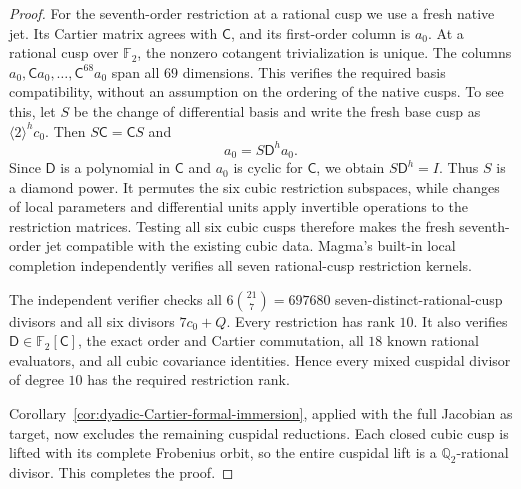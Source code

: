 \begin{proof}
For the seventh-order restriction at a rational cusp we use a
fresh native jet. Its Cartier matrix agrees with $\mathsf C$,
and its first-order column is $a_0$. At a rational cusp over
$\mathbb F_2$, the nonzero cotangent trivialization is unique. The columns
$a_0,\mathsf C a_0,\ldots,\mathsf C^{68}a_0$ span all $69$
dimensions. This verifies the required basis compatibility,
without an assumption on the ordering of the native cusps.
To see this, let $S$ be the change of differential basis and write
the fresh base cusp as $\langle2\rangle^h c_0$. Then
$S\mathsf C=\mathsf C S$ and
\[
 a_0=S\mathsf D^h a_0.
\]
Since $\mathsf D$ is a polynomial in $\mathsf C$ and $a_0$ is
cyclic for $\mathsf C$, we obtain $S\mathsf D^h=I$.
Thus $S$ is a diamond power. It permutes the six cubic restriction
subspaces, while changes of local parameters and differential
units apply invertible operations to the restriction matrices.
Testing all six cubic cusps therefore makes the fresh
seventh-order jet compatible with the existing cubic data.
Magma's built-in local completion independently verifies all seven
rational-cusp restriction kernels.

The independent verifier checks all
$6\binom{21}{7}=697680$ seven-distinct-rational-cusp divisors and
all six divisors $7c_0+Q$. Every restriction has rank $10$.
It also verifies $\mathsf D\in\mathbb F_2[\mathsf C]$, the exact
order and Cartier commutation, all $18$ known rational evaluators,
and all cubic covariance identities. Hence every mixed cuspidal
divisor of degree $10$ has the required restriction rank.

Corollary~\ref{cor:dyadic-Cartier-formal-immersion}, applied with the full Jacobian as
target, now excludes the remaining cuspidal reductions. Each
closed cubic cusp is lifted with its complete Frobenius orbit,
so the entire cuspidal lift is a $\mathbb Q_2$-rational divisor.
This completes the proof.
\end{proof}
